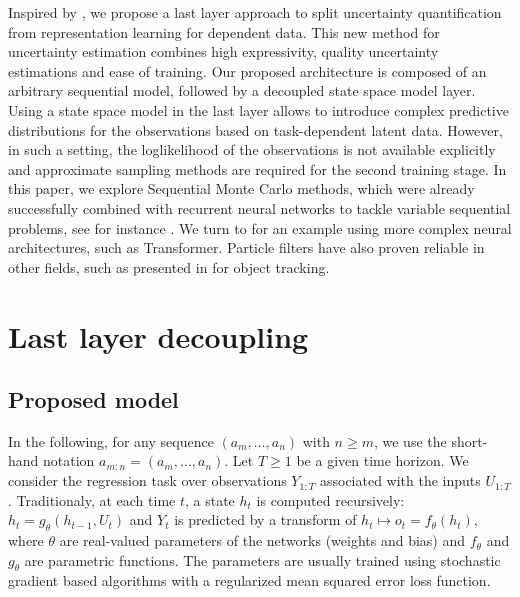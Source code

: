 \documentclass[journal]{IEEEtran}
\begin{document}
Inspired by  \cite{Brosse2020OnLA}, we propose a last layer approach to split uncertainty quantification from representation learning for dependent data.  This new method for uncertainty estimation combines high expressivity, quality uncertainty estimations and ease of training. Our proposed architecture is composed of an arbitrary sequential model, followed by a decoupled state space model layer. Using a state space model in the last layer allows to introduce complex predictive distributions for the observations based on task-dependent latent data. However, in such a setting, the loglikelihood of the observations is not available explicitly and approximate sampling methods are required for the second training stage.   In this paper, we explore Sequential Monte Carlo methods, which were already successfully combined with recurrent neural networks to tackle variable sequential problems, see for instance \cite{Ma2020}.
We turn to \cite{Martin2020TheMC} for an example using more complex neural architectures, such as Transformer.
Particle filters have also proven reliable in other fields, such as presented in \cite{Liu2020LSTMPF} for object tracking.




\section{Last layer decoupling}
\label{sec:decoupling}

\subsection{Proposed model}%
\label{sub:proposed_architecture}

In the following, for any sequence $(a_m,\ldots, a_n)$ with $n\geq m$, we use the short-hand notation $a_{m:n} = (a_m,\ldots, a_n)$.
Let $T\ge 1$ be a given time horizon.
We consider the regression task over observations $Y_{1:T}$ associated with the inputs $U_{1:T}$.
Traditionaly, at each time $t$, a state $h_t$ is computed recursively: $h_t = g_\theta(h_{t-1},U_t)$ and $Y_t$ is predicted by a transform of $h_t \mapsto o_t = f_\theta(h_t)$, where $\theta$ are real-valued parameters of the networks (weights and bias) and $f_\theta$ and $g_\theta$ are parametric functions.
The parameters are usually trained using stochastic gradient based algorithms with a regularized mean squared error loss function.
\end{document}

